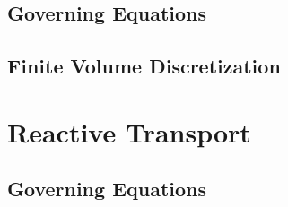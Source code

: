 \documentclass[12pt]{article}
\begin{document}
\subsection{Governing Equations}

\subsection{Finite Volume Discretization}


\section{Reactive Transport}
\label{sec:chem}

\subsection{Governing Equations}
\end{document}

